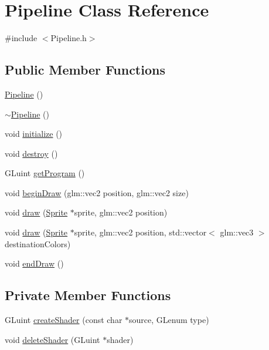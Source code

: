 \hypertarget{class_pipeline}{}\section{Pipeline Class Reference}
\label{class_pipeline}


{\ttfamily \#include $<$Pipeline.\+h$>$}

\subsection*{Public Member Functions}
\begin{DoxyCompactItemize}
\item 
\hyperlink{class_pipeline_a79e49366358f823b8812658f8bf3a9e8}{Pipeline} ()
\item 
\hyperlink{class_pipeline_a527044d53a20f851d0579fbf313a2dec}{$\sim$\+Pipeline} ()
\item 
void \hyperlink{class_pipeline_a95d7452e4c7235d08344f1d8a8902b53}{initialize} ()
\item 
void \hyperlink{class_pipeline_a3059fbbdb1821ccd7deee8bf0d49ba77}{destroy} ()
\item 
G\+Luint \hyperlink{class_pipeline_a882e5827af527efb4306f12039464fb5}{get\+Program} ()
\item 
void \hyperlink{class_pipeline_a5fb0c15f2cb7af2c7f4a7a365a6115d1}{begin\+Draw} (glm\+::vec2 position, glm\+::vec2 size)
\item 
void \hyperlink{class_pipeline_ab5881644be6d1061be1cbc90a6724681}{draw} (\hyperlink{class_sprite}{Sprite} $\ast$sprite, glm\+::vec2 position)
\item 
void \hyperlink{class_pipeline_a69e2a417b8d5777c11d5bf36d0048dad}{draw} (\hyperlink{class_sprite}{Sprite} $\ast$sprite, glm\+::vec2 position, std\+::vector$<$ glm\+::vec3 $>$ destination\+Colors)
\item 
void \hyperlink{class_pipeline_a7a20d0da3c07f08276058e72d4012ff8}{end\+Draw} ()
\end{DoxyCompactItemize}
\subsection*{Private Member Functions}
\begin{DoxyCompactItemize}
\item 
G\+Luint \hyperlink{class_pipeline_a6b08f1cee6613c60bca5bde2579bbda2}{create\+Shader} (const char $\ast$source, G\+Lenum type)
\item 
void \hyperlink{class_pipeline_a171de6cafdea4a00d1a23bedc1fa63b5}{delete\+Shader} (G\+Luint $\ast$shader)
\end{DoxyCompactItemize}
